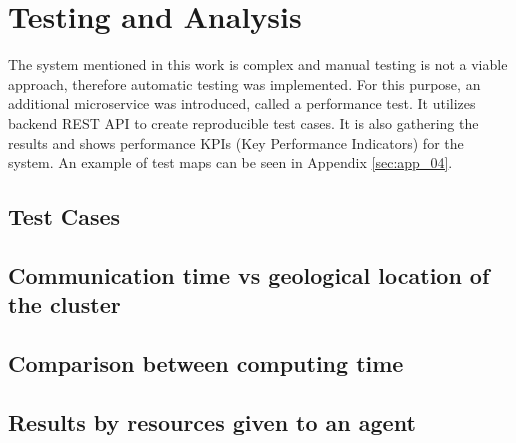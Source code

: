 \chapter{Testing and Analysis}
The system mentioned in this work is complex and manual testing is not a viable approach, therefore automatic testing was implemented. For this purpose, an additional microservice was introduced, called a performance test. It utilizes backend REST API to create reproducible test cases. It is also gathering the results and shows performance KPIs (Key Performance Indicators) for the system. An example of test maps can be seen in Appendix \ref{sec:app_04}.

\section{Test Cases}


\section{Communication time vs geological location of the cluster}


\section{Comparison between computing time}


\section{Results by resources given to an agent}



